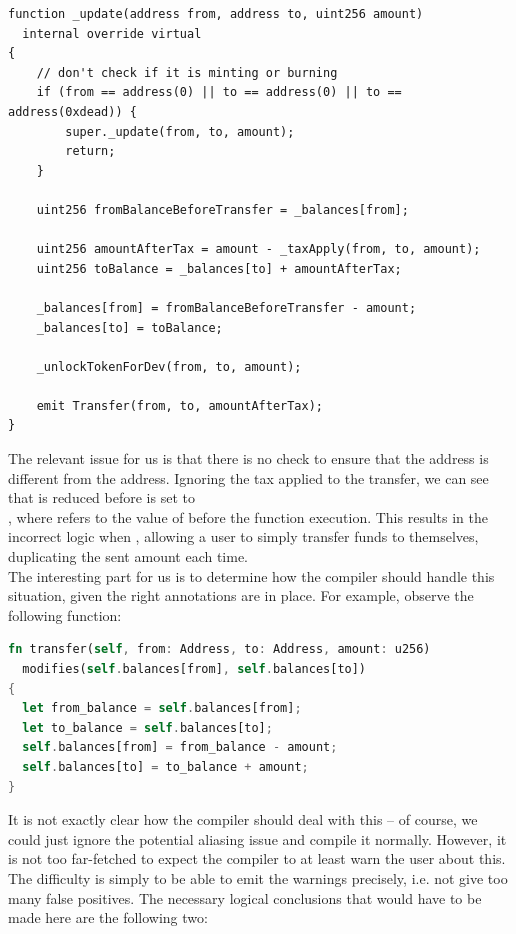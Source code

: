\begin{lstlisting}[language=Solidity, style=boxedSol]
function _update(address from, address to, uint256 amount)
  internal override virtual
{
    // don't check if it is minting or burning
    if (from == address(0) || to == address(0) || to == address(0xdead)) {
        super._update(from, to, amount);
        return;
    }

    uint256 fromBalanceBeforeTransfer = _balances[from];

    uint256 amountAfterTax = amount - _taxApply(from, to, amount);
    uint256 toBalance = _balances[to] + amountAfterTax;

    _balances[from] = fromBalanceBeforeTransfer - amount;
    _balances[to] = toBalance;

    _unlockTokenForDev(from, to, amount);

    emit Transfer(from, to, amountAfterTax);
}
\end{lstlisting}
The relevant issue for us is that there is no check to ensure that the  address is different from the  address. Ignoring the tax applied to the transfer, we can see that  is reduced before  is set to \\
, where  refers to the value of  before the function execution. This results in the incorrect logic when , allowing a user to simply transfer funds to themselves, duplicating the sent amount each time. \\
The interesting part for us is to determine how the compiler should handle this situation, given the right annotations are in place. For example, observe the following function:
\begin{lstlisting}[language=Rust, style=boxed]
fn transfer(self, from: Address, to: Address, amount: u256)
  modifies(self.balances[from], self.balances[to])
{
  let from_balance = self.balances[from];
  let to_balance = self.balances[to];
  self.balances[from] = from_balance - amount;
  self.balances[to] = to_balance + amount;
}
\end{lstlisting}
It is not exactly clear how the compiler should deal with this -- of course, we could just ignore the potential aliasing issue and compile it normally. However, it is not too far-fetched to expect the compiler to at least warn the user about this. The difficulty is simply to be able to emit the warnings precisely, i.e. not give too many false positives. The necessary logical conclusions that would have to be made here are the following two:
